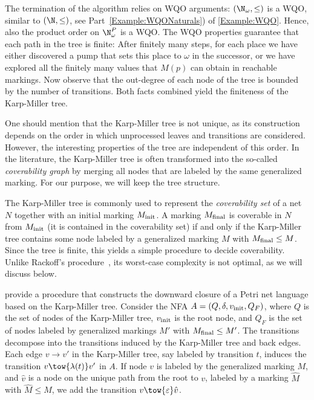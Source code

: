 \documentclass[../../diss.tex]{subfiles}
\begin{document}
The termination of the algorithm relies on WQO arguments:
$(\N_\omega,\leq)$ is a WQO, similar to $(\N,\leq)$, see Part~\ref{Example:WQONaturals}) of \cref{Example:WQO}.
Hence, also the product order on $\N_\omega^P$ is a WQO.\@
The WQO properties guarantee that each path in the tree is finite:
After finitely many steps, for each place we have either discovered a pump that sets this place to $\omega$ in the successor, or we have explored all the finitely many values that $M(p)$ can obtain in reachable markings.
Now observe that the out-degree of each node of the tree is bounded by the number of transitions.
Both facts combined yield the finiteness of the Karp-Miller tree.

One should mention that the Karp-Miller tree is not unique, as its construction depends on the order in which unprocessed leaves and transitions are considered.
However, the interesting properties of the tree are independent of this order.
In the literature, the Karp-Miller tree is often transformed into the so-called \emph{coverability graph} by merging all nodes that are labeled by the same generalized marking.
For our purpose, we will keep the tree structure.

The Karp-Miller tree is commonly used to represent the \emph{coverability set} of a net $N$ together with an initial marking $M_{\text{init}}$.
A marking $M_{\text{final}}$ is coverable in $N$ from $M_{\text{init}}$ (\ie it is contained in the coverability set) if and only if the Karp-Miller tree contains some node labeled by a generalized marking $M$ with $M_{\text{final}} \leq M$.
Since the tree is finite, this yields a simple procedure to decide coverability.
Unlike Rackoff's procedure~\cite{Rackoff78}, its worst-case complexity is not optimal, as we will discuss below.

 provide a procedure that constructs the downward closure of a Petri net language based on the Karp-Miller tree.
Consider the NFA $A = (Q, \delta, v_{\text{init}}, Q_F)$, where $Q$ is the set of nodes of the Karp-Miller tree, $v_{\text{init}}$ is the root node, and $Q_F$ is the set of nodes labeled by generalized markings $M'$ with $M_{\text{final}} \leq M'$.
The transitions decompose into the transitions induced by the Karp-Miller tree and back edges.
Each edge $v \to v'$ in the Karp-Miller tree, say labeled by transition $t$, induces the transition $v \tow{\lambda(t)} v'$ in $A$.
If node $v$ is labeled by the generalized marking $M$, and $\hat{v}$ is a node on the unique path from the root to $v$, labeled by a marking $\hat{M}$ with $\hat{M} \leq M$, we add the transition $v \tow{\eps} \hat{v}$.
\end{document}
